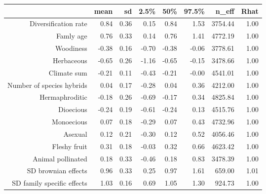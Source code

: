 \begin{table}[ht]
\centering
\begin{tabular}{rrrrrrrr}
  \hline
 & mean & sd & 2.5\% & 50\% & 97.5\% & n\_eff & Rhat \\ 
  \hline
Diversification rate & 0.84 & 0.36 & 0.15 & 0.84 & 1.53 & 3754.44 & 1.00 \\ 
  Famly age & 0.76 & 0.33 & 0.14 & 0.76 & 1.41 & 4772.19 & 1.00 \\ 
  Woodiness & -0.38 & 0.16 & -0.70 & -0.38 & -0.06 & 3778.61 & 1.00 \\ 
  Herbaceous & -0.65 & 0.26 & -1.16 & -0.65 & -0.15 & 3478.66 & 1.00 \\ 
  Climate sum & -0.21 & 0.11 & -0.43 & -0.21 & -0.00 & 4541.01 & 1.00 \\ 
  Number of species hybrids & 0.04 & 0.17 & -0.28 & 0.04 & 0.36 & 4212.00 & 1.00 \\ 
  Hermaphroditic & -0.18 & 0.26 & -0.69 & -0.17 & 0.34 & 4825.84 & 1.00 \\ 
  Dioecious & -0.24 & 0.19 & -0.61 & -0.24 & 0.13 & 4515.76 & 1.00 \\ 
  Monoecious & 0.07 & 0.18 & -0.29 & 0.07 & 0.43 & 4732.96 & 1.00 \\ 
  Asexual & 0.12 & 0.21 & -0.30 & 0.12 & 0.52 & 4056.46 & 1.00 \\ 
  Fleshy fruit & 0.31 & 0.18 & -0.03 & 0.32 & 0.66 & 4623.42 & 1.00 \\ 
  Animal pollinated & 0.18 & 0.33 & -0.46 & 0.18 & 0.83 & 3478.39 & 1.00 \\ 
  SD brownian effects & 0.96 & 0.33 & 0.25 & 0.97 & 1.61 & 659.00 & 1.01 \\ 
  SD family specific effects & 1.03 & 0.16 & 0.69 & 1.05 & 1.30 & 924.73 & 1.00 \\ 
   \hline
\end{tabular}
\end{table}
